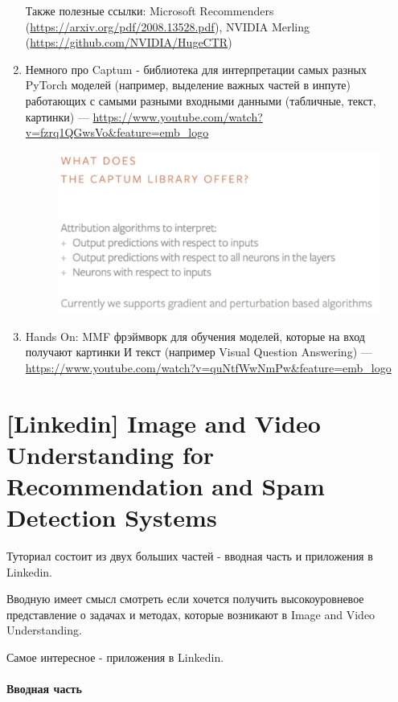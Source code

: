 \begin{enumerate}
        Также полезные ссылки: Microsoft Recommenders (\url{https://arxiv.org/pdf/2008.13528.pdf}), NVIDIA Merling (\url{https://github.com/NVIDIA/HugeCTR})
    \item Немного про Captum - библиотека для интерпретации самых разных PyTorch моделей (например, выделение важных частей в инпуте) работающих с самыми разными входными данными (табличные, текст, картинки) --- \url{https://www.youtube.com/watch?v=fzrq1QGwsVo&feature=emb_logo}
        \begin{figure}[ht]
            \centering
            \includegraphics[width=0.5\linewidth]{parts/recsys/images/captum.png}
        \end{figure}
    \item Hands On: MMF фрэймворк для обучения моделей, которые на вход получают картинки И текст (например Visual Question Answering) --- \url{https://www.youtube.com/watch?v=quNtfWwNmPw&feature=emb_logo}
\end{enumerate}


\section{[Linkedin] Image and Video Understanding for Recommendation and Spam Detection Systems}

Туториал состоит из двух больших частей - вводная часть и приложения в Linkedin.  

Вводную имеет смысл смотреть если хочется получить высокоуровневое представление о задачах и методах, которые возникают в Image and Video Understanding.

Самое интересное - приложения в Linkedin.

\paragraph{Вводная часть}

